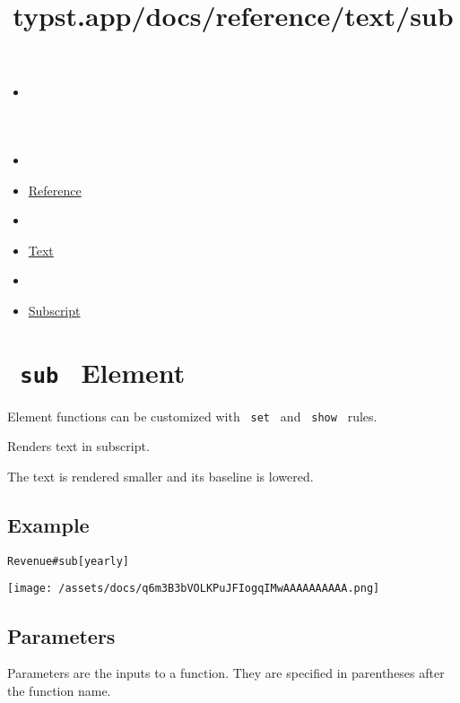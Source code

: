 \title{typst.app/docs/reference/text/sub}

\begin{itemize}
\tightlist
\item
  \href{/docs}{}
\item
  
\item
  \href{/docs/reference/}{Reference}
\item
  
\item
  \href{/docs/reference/text/}{Text}
\item
  
\item
  \href{/docs/reference/text/sub/}{Subscript}
\end{itemize}

\section{\texorpdfstring{\texttt{\ sub\ } {{ Element
}}}{ sub   Element }}\label{summary}

\label{element-tooltip}
Element functions can be customized with \texttt{\ set\ } and
\texttt{\ show\ } rules.

Renders text in subscript.

The text is rendered smaller and its baseline is lowered.

\subsection{Example}\label{example}

\begin{verbatim}
Revenue#sub[yearly]
\end{verbatim}

\texttt{[image: /assets/docs/q6m3B3bVOLKPuJFIogqIMwAAAAAAAAAA.png]}

\subsection{\texorpdfstring{{ Parameters
}}{ Parameters }}\label{parameters}

\label{parameters-tooltip}
Parameters are the inputs to a function. They are specified in
parentheses after the function name.

